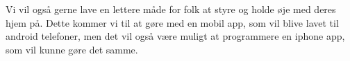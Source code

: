 Vi vil også gerne lave en lettere måde for folk at styre og holde øje med deres hjem på. Dette kommer vi til at gøre med en mobil app, som vil blive lavet til android telefoner, men det vil også være muligt at programmere en iphone app, som vil kunne gøre det samme.